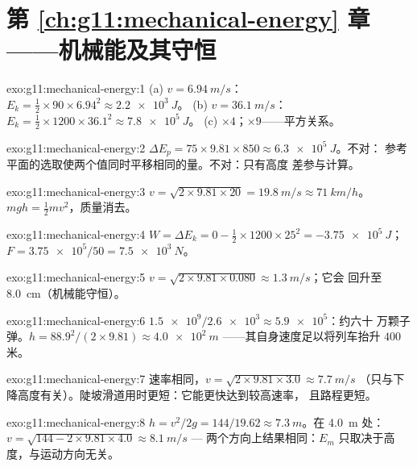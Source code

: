 \section*{第 \ref{ch:g11:mechanical-energy} 章——机械能及其守恒}

\begin{solution}{exo:g11:mechanical-energy:1}
(a) $v = \qty{6.94}{m/s}$：
$E_k = \tfrac12 \times 90 \times 6.94^2 \approx \qty{2.2e3}{J}$。
(b) $v = \qty{36.1}{m/s}$：
$E_k = \tfrac12 \times 1200 \times 36.1^2 \approx \qty{7.8e5}{J}$。
(c) $\times 4$；$\times 9$——平方关系。
\end{solution}

\begin{solution}{exo:g11:mechanical-energy:2}
$\Delta E_p = 75 \times 9.81 \times 850 \approx \qty{6.3e5}{J}$。不对：
参考平面的选取使两个值同时平移相同的量。不对：只有高度
差参与计算。
\end{solution}

\begin{solution}{exo:g11:mechanical-energy:3}
$v = \sqrt{2 \times 9.81 \times 20} = \qty{19.8}{m/s} \approx
\qty{71}{km/h}$。$mgh = \tfrac12 mv^2$，质量消去。
\end{solution}

\begin{solution}{exo:g11:mechanical-energy:4}
$W = \Delta E_k = 0 - \tfrac12 \times 1200 \times 25^2 =
\qty{-3.75e5}{J}$；$F = \num{3.75e5}/50 = \qty{7.5e3}{N}$。
\end{solution}

\begin{solution}{exo:g11:mechanical-energy:5}
$v = \sqrt{2 \times 9.81 \times 0.080} \approx \qty{1.3}{m/s}$；它会
回升至 \qty{8.0}{cm}（机械能守恒）。
\end{solution}

\begin{solution}{exo:g11:mechanical-energy:6}
$\num{1.5e9}/\num{2.6e3} \approx \num{5.9e5}$：约六十
万颗子弹。$h = 88.9^2/(2 \times 9.81) \approx \qty{4.0e2}{m}$
——其自身速度足以将列车抬升 $400$ 米。
\end{solution}

\begin{solution}{exo:g11:mechanical-energy:7}
速率相同，$v = \sqrt{2 \times 9.81 \times 3.0} \approx \qty{7.7}{m/s}$
（只与下降高度有关）。陡坡滑道用时更短：它能更快达到较高速率，
且路程更短。
\end{solution}

\begin{solution}{exo:g11:mechanical-energy:8}
$h = v^2/2g = 144/19.62 \approx \qty{7.3}{m}$。在 \qty{4.0}{m} 处：
$v = \sqrt{144 - 2 \times 9.81 \times 4.0} \approx \qty{8.1}{m/s}$ ---
两个方向上结果相同：$E_m$ 只取决于高度，与运动方向无关。
\end{solution}


